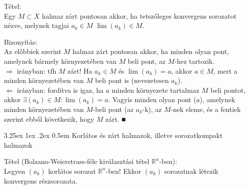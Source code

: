 \documentclass[12pt,a4paper]{scrartcl}
\makeatletter
\renewcommand\paragraph{\@startsection{paragraph}{4}{\z@}%
                                    {3.25ex \@plus1ex \@minus.2ex}%
                                    {0.5em} %
                                    {\normalfont\normalsize\bfseries}}
\newenvironment{tetel}{}{}
\newenvironment{bizonyitas}{}{}
\makeatother
\begin{document}
\begin{tetel}

Tétel:\\
Egy \(M \subset X\) halmaz zárt pontosan akkor, ha tetszőleges
konvergens sorozatot nézve, melynek tagjai \(a_{k} \in M\)
\(\lim\left( a_{k} \right) \in M\).

\end{tetel}

\begin{bizonyitas}

Bizonyítás:\\
Az előbbiek szerint \(M\) halmaz zárt pontosan akkor, ha minden olyan
pont, amelynek bármely környezetében van \(M\) beli pont, az \(M\)-hez
tartozik.\\
\(\Rightarrow\) irányban: tfh \(M\) zárt! Ha \(a_{k} \in M\) és
\(\lim\left( a_{k} \right) = a\), akkor \(a \in M\), mert a minden
környezetében van \(M\) beli pont is (nevezetesen \(a_{k}\)).\\
\(\Leftarrow\) irányban: fordítva is igaz, ha \(a\) minden környezete
tartalmaz \(M\) beli pontot, akkor
\(\exists\left( a_{k} \right) \in M:\lim\left( a_{k} \right) = a\).
Vagyis minden olyan pont (\(a\)), amelynek minden környezetében van
\(M\)-beli pont (az \(a_{k}\)-k), az \(M\)-nek eleme, és a fentiek
szerint ebből következik, hogy \(M\) zárt. ■

\end{bizonyitas}

\hypertarget{korluxe1tos-uxe9s-zuxe1rt-halmazok-illetve-sorozatkompakt-halmazok}{%
\paragraph{Korlátos és zárt halmazok, illetve sorozatkompakt
halmazok}\label{korluxe1tos-uxe9s-zuxe1rt-halmazok-illetve-sorozatkompakt-halmazok}}

\begin{tetel}

Tétel (Bolzano-Weierstrass-féle kiválasztási tétel
\({\mathbb{R}}^{n}\)-ben):\\
Legyen \(\left( a_{k} \right)\) korlátos sorozat
\({\mathbb{R}}^{n}\)-ben! Ekkor \(\left( a_{k} \right)\) sorozatnak
létezik konvergens részsorozata.

\end{tetel}
\end{document}
